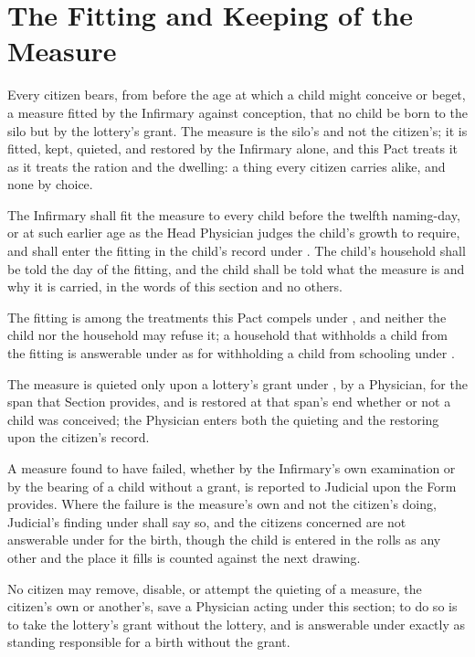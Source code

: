 \section{The Fitting and Keeping of the Measure}
\label{sec:marriage:fitting-and-keeping-of-the-measure}

Every citizen bears, from before the age at which a child might conceive or beget, a measure fitted by the Infirmary against conception, that no child be born to the silo but by the lottery's grant. The measure is the silo's and not the citizen's; it is fitted, kept, quieted, and restored by the Infirmary alone, and this Pact treats it as it treats the ration and the dwelling: a thing every citizen carries alike, and none by choice.

\begin{clauses}
\item The Infirmary shall fit the measure to every child before the twelfth naming-day, or at such earlier age as the Head Physician judges the child's growth to require, and shall enter the fitting in the child's record under . The child's household shall be told the day of the fitting, and the child shall be told what the measure is and why it is carried, in the words of this section and no others.
\item The fitting is among the treatments this Pact compels under , and neither the child nor the household may refuse it; a household that withholds a child from the fitting is answerable under  as for withholding a child from schooling under .
\item The measure is quieted only upon a lottery's grant under , by a Physician, for the span that Section provides, and is restored at that span's end whether or not a child was conceived; the Physician enters both the quieting and the restoring upon the citizen's record.
\item A measure found to have failed, whether by the Infirmary's own examination or by the bearing of a child without a grant, is reported to Judicial upon the Form  provides. Where the failure is the measure's own and not the citizen's doing, Judicial's finding under  shall say so, and the citizens concerned are not answerable under  for the birth, though the child is entered in the rolls as any other and the place it fills is counted against the next drawing.
\item No citizen may remove, disable, or attempt the quieting of a measure, the citizen's own or another's, save a Physician acting under this section; to do so is to take the lottery's grant without the lottery, and is answerable under  exactly as standing responsible for a birth without the grant.
\end{clauses}

